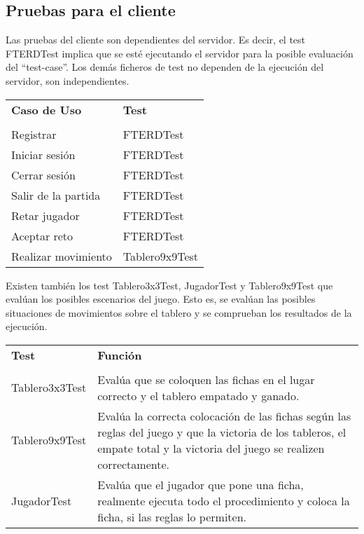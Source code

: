\clearpage

\subsection{Pruebas para el cliente}

Las pruebas del cliente son dependientes del servidor. Es decir, el test FTERDTest implica que se esté ejecutando el servidor para la posible evaluación del ``test-case''. Los demás ficheros de test no dependen de la ejecución del servidor, son independientes.


\begin{center}
{\footnotesize
\begin{tabularx}{0.95\textwidth}{p{}|X}

\textbf{Caso de Uso} & \textbf{Test} \\
& \\
Registrar & FTERDTest\\
Iniciar sesión & FTERDTest\\
Cerrar sesión &FTERDTest \\
Salir de la partida & FTERDTest\\
Retar jugador &FTERDTest \\
Aceptar reto&FTERDTest\\
Realizar movimiento& Tablero9x9Test\\
\end{tabularx}
}
\end{center}

Existen también los test Tablero3x3Test, JugadorTest y Tablero9x9Test que evalúan los posibles escenarios del juego. Esto es, se evalúan las posibles situaciones de movimientos sobre el tablero y se comprueban los resultados de la ejecución.
\begin{center}
{\footnotesize
\begin{tabularx}{0.95\textwidth}{p{}|X}

\textbf{Test} & \textbf{Función} \\
& \\
Tablero3x3Test & Evalúa que se coloquen las fichas en el lugar correcto y el tablero empatado y ganado.\\
Tablero9x9Test & Evalúa la correcta colocación de las fichas según las reglas del juego y que la victoria de los tableros, el empate total y la victoria del juego se realizen correctamente. \\
JugadorTest &Evalúa que el jugador que pone una ficha, realmente ejecuta todo el procedimiento y coloca la ficha, si las reglas lo permiten. \\
\end{tabularx}
}
\end{center}